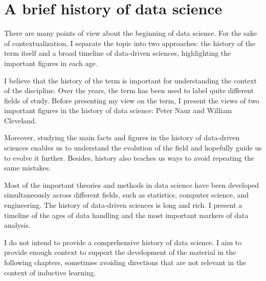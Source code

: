 \chapter{A brief history of data science}
\label{chap:history}
\glsresetall


There are many points of view about the beginning of data science.  For the sake of
contextualization, I separate the topic into two approaches: the history of the term itself
and a broad timeline of data-driven sciences, highlighting the important figures in each
age.

I believe that the history of the term is important for understanding the context of the
discipline. Over the years, the term has been used to label quite different fields of
study.  Before presenting my view on the term, I present the views of two important
figures in the history of data science: Peter Naur and William Cleveland.

Moreover, studying the main facts and figures in the history of data-driven sciences
enables us to understand the evolution of the field and hopefully guide us to evolve it
further.  Besides, history also teaches us ways to avoid repeating the same mistakes.

Most of the important theories and methods in data science have been developed
simultaneously across different fields, such as statistics, computer science, and engineering.
The history of data-driven sciences is long and rich. I present a timeline of the ages of
data handling and the most important markers of data analysis.

I do not intend to provide a comprehensive history of data science.  I aim to provide
enough context to support the development of the material in the following chapters,
sometimes avoiding directions that are not relevant in the context of inductive learning.

